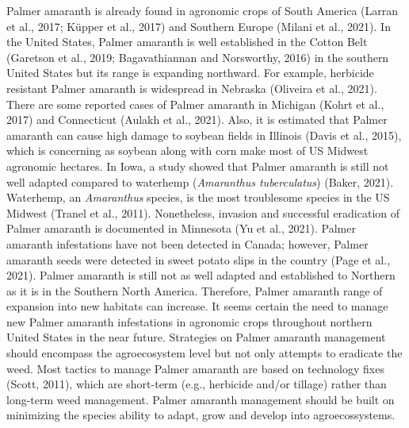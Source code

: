 \documentclass[utf8]{frontiersSCNS}
\begin{document}
Palmer amaranth is already found in agronomic crops of South America
(Larran et al., 2017; Küpper et al., 2017) and Southern Europe (Milani
et al., 2021). In the United States, Palmer amaranth is well established
in the Cotton Belt (Garetson et al., 2019; Bagavathiannan and
Norsworthy, 2016) in the southern United States but its range is
expanding northward. For example, herbicide resistant Palmer amaranth is
widespread in Nebraska (Oliveira et al., 2021). There are some reported
cases of Palmer amaranth in Michigan (Kohrt et al., 2017) and
Connecticut (Aulakh et al., 2021). Also, it is estimated that Palmer
amaranth can cause high damage to soybean fields in Illinois (Davis et
al., 2015), which is concerning as soybean along with corn make most of
US Midwest agronomic hectares. In Iowa, a study showed that Palmer
amaranth is still not well adapted compared to waterhemp
(\emph{Amaranthus tuberculatus}) (Baker, 2021). Waterhemp, an
\emph{Amaranthus} species, is the most troublesome species in the US
Midwest (Tranel et al., 2011). Nonetheless, invasion and successful
eradication of Palmer amaranth is documented in Minnesota (Yu et al.,
2021). Palmer amaranth infestations have not been detected in Canada;
however, Palmer amaranth seeds were detected in sweet potato slips in
the country (Page et al., 2021). Palmer amaranth is still not as well
adapted and established to Northern as it is in the Southern North
America. Therefore, Palmer amaranth range of expansion into new habitats
can increase. It seems certain the need to manage new Palmer amaranth
infestations in agronomic crops throughout northern United States in the
near future. Strategies on Palmer amaranth management should encompass
the agroecosystem level but not only attempts to eradicate the weed.
Most tactics to manage Palmer amaranth are based on technology fixes
(Scott, 2011), which are short-term (e.g., herbicide and/or tillage)
rather than long-term weed management. Palmer amaranth management should
be built on minimizing the species ability to adapt, grow and develop
into agroecossystems.
\end{document}
